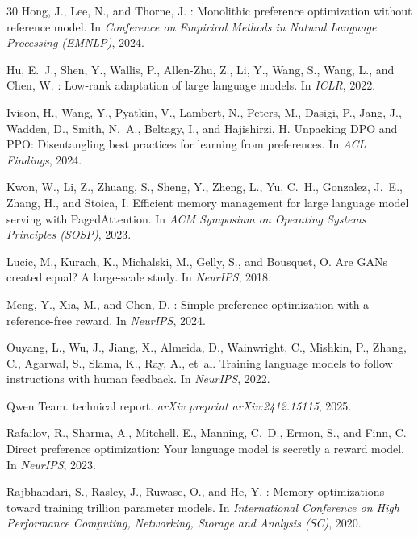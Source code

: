 \documentclass{article}
\begin{document}
\begin{thebibliography}{30}
Hong, J., Lee, N., and Thorne, J.
: Monolithic preference optimization without reference model.
\newblock In \emph{Conference on Empirical Methods in Natural Language Processing (EMNLP)}, 2024.

Hu, E.~J., Shen, Y., Wallis, P., Allen-Zhu, Z., Li, Y., Wang, S., Wang, L., and Chen, W.
: Low-rank adaptation of large language models.
\newblock In \emph{ICLR}, 2022.

Ivison, H., Wang, Y., Pyatkin, V., Lambert, N., Peters, M., Dasigi, P., Jang, J., Wadden, D., Smith, N.~A., Beltagy, I., and Hajishirzi, H.
\newblock Unpacking {DPO} and {PPO}: Disentangling best practices for learning from preferences.
\newblock In \emph{ACL Findings}, 2024.

Kwon, W., Li, Z., Zhuang, S., Sheng, Y., Zheng, L., Yu, C.~H., Gonzalez, J.~E., Zhang, H., and Stoica, I.
\newblock Efficient memory management for large language model serving with {PagedAttention}.
\newblock In \emph{ACM Symposium on Operating Systems Principles (SOSP)}, 2023.

Lucic, M., Kurach, K., Michalski, M., Gelly, S., and Bousquet, O.
\newblock Are {GANs} created equal? {A} large-scale study.
\newblock In \emph{NeurIPS}, 2018.

Meng, Y., Xia, M., and Chen, D.
: Simple preference optimization with a reference-free reward.
\newblock In \emph{NeurIPS}, 2024.

Ouyang, L., Wu, J., Jiang, X., Almeida, D., Wainwright, C., Mishkin, P., Zhang, C., Agarwal, S., Slama, K., Ray, A., et~al.
\newblock Training language models to follow instructions with human feedback.
\newblock In \emph{NeurIPS}, 2022.

Qwen Team.
 technical report.
\newblock \emph{arXiv preprint arXiv:2412.15115}, 2025.

Rafailov, R., Sharma, A., Mitchell, E., Manning, C.~D., Ermon, S., and Finn, C.
\newblock Direct preference optimization: Your language model is secretly a reward model.
\newblock In \emph{NeurIPS}, 2023.

Rajbhandari, S., Rasley, J., Ruwase, O., and He, Y.
: Memory optimizations toward training trillion parameter models.
\newblock In \emph{International Conference on High Performance Computing, Networking, Storage and Analysis (SC)}, 2020.


\end{thebibliography}
\end{document}
